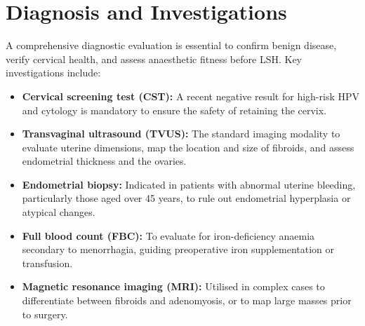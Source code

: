 \section*{Diagnosis and Investigations}
A comprehensive diagnostic evaluation is essential to confirm benign disease, verify cervical health, and assess anaesthetic fitness before LSH. Key investigations include:
\begin{itemize}
    \item \textbf{Cervical screening test (CST):} A recent negative result for high-risk HPV and cytology is mandatory to ensure the safety of retaining the cervix.
    \item \textbf{Transvaginal ultrasound (TVUS):} The standard imaging modality to evaluate uterine dimensions, map the location and size of fibroids, and assess endometrial thickness and the ovaries.
    \item \textbf{Endometrial biopsy:} Indicated in patients with abnormal uterine bleeding, particularly those aged over 45 years, to rule out endometrial hyperplasia or atypical changes.
    \item \textbf{Full blood count (FBC):} To evaluate for iron-deficiency anaemia secondary to menorrhagia, guiding preoperative iron supplementation or transfusion.
    \item \textbf{Magnetic resonance imaging (MRI):} Utilised in complex cases to differentiate between fibroids and adenomyosis, or to map large masses prior to surgery.
\end{itemize}

